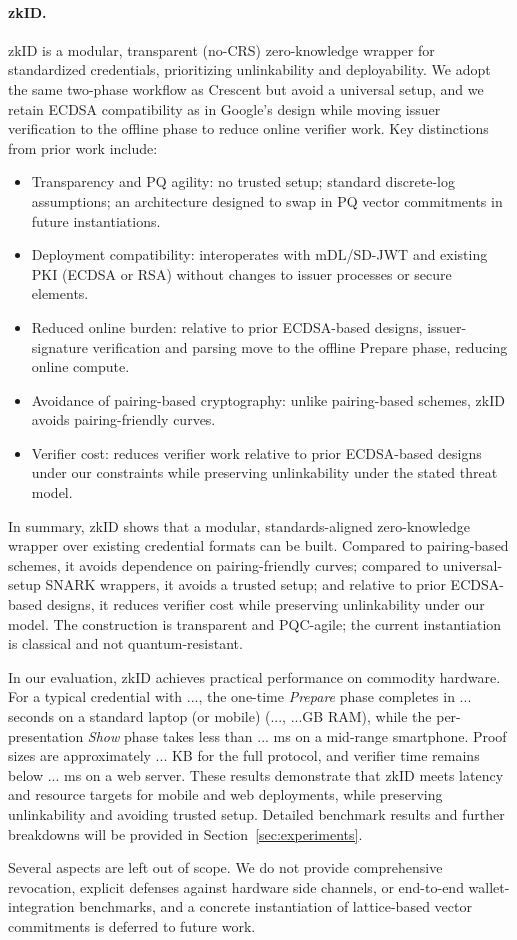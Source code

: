 \paragraph{zkID.}
zkID is a modular, transparent (no-CRS) zero-knowledge wrapper for standardized credentials, prioritizing unlinkability and deployability. We adopt the same two-phase workflow as Crescent but avoid a universal setup, and we retain ECDSA compatibility as in Google’s design while moving issuer verification to the offline phase to reduce online verifier work. Key distinctions from prior work include:
\begin{itemize}
  \item Transparency and PQ agility: no trusted setup; standard discrete-log assumptions; an architecture designed to swap in PQ vector commitments in future instantiations.
  \item Deployment compatibility: interoperates with mDL/SD-JWT and existing PKI (ECDSA or RSA) without changes to issuer processes or secure elements.
  \item Reduced online burden: relative to prior ECDSA-based designs, issuer-signature verification and parsing move to the offline Prepare phase, reducing online compute.
  \item Avoidance of pairing-based cryptography: unlike pairing-based schemes, zkID avoids pairing-friendly curves.
  \item Verifier cost: reduces verifier work relative to prior ECDSA-based designs under our constraints while preserving unlinkability under the stated threat model.
\end{itemize}

In summary, zkID shows that a modular, standards-aligned zero-knowledge wrapper over existing credential formats can be built. Compared to pairing-based schemes, it avoids dependence on pairing-friendly curves; compared to universal-setup SNARK wrappers, it avoids a trusted setup; and relative to prior ECDSA-based designs, it reduces verifier cost while preserving unlinkability under our model. The construction is transparent and PQC-agile; the current instantiation is classical and not quantum-resistant.

In our evaluation, zkID achieves practical performance on commodity hardware. For a typical credential with ..., the one-time \emph{Prepare} phase completes in ... seconds on a standard laptop (or mobile) (..., ...GB RAM), while the per-presentation \emph{Show} phase takes less than ... ms on a mid-range smartphone. Proof sizes are approximately ... KB for the full protocol, and verifier time remains below ... ms on a web server. These results demonstrate that zkID meets latency and resource targets for mobile and web deployments, while preserving unlinkability and avoiding trusted setup. Detailed benchmark results and further breakdowns will be provided in Section~\ref{sec:experiments}.

Several aspects are left out of scope. We do not provide comprehensive revocation, explicit defenses against hardware side channels, or end-to-end wallet-integration benchmarks, and a concrete instantiation of lattice-based vector commitments is deferred to future work.